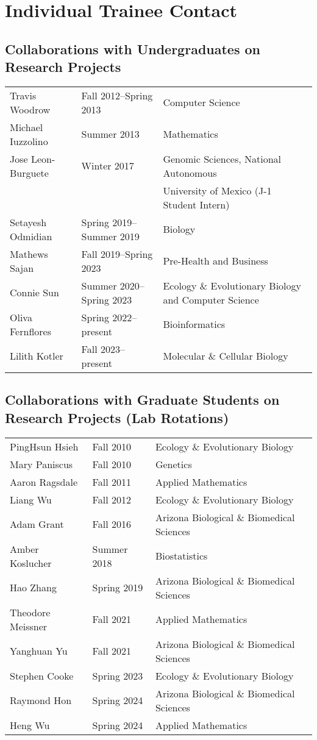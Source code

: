 \documentclass[11pt]{article}
\begin{document}
\section*{Individual Trainee Contact}

\subsection*{Collaborations with Undergraduates on Research Projects}
\begin{longtable}[l]{l l l}
Travis Woodrow & Fall 2012--Spring 2013 & Computer Science\\
Michael Iuzzolino & Summer 2013 & Mathematics\\
Jose Leon-Burguete & Winter 2017 & Genomic Sciences, National Autonomous\\ 
                   &             & University of Mexico (J-1 Student Intern)\\
Setayesh Odmidian & Spring 2019--Summer 2019 & Biology\\
Mathews Sajan & Fall 2019--Spring 2023 & Pre-Health and Business\\
Connie Sun & Summer 2020--Spring 2023 & Ecology \& Evolutionary Biology and Computer Science\\
Oliva Fernflores & Spring 2022--present & Bioinformatics\\
Lilith Kotler & Fall 2023--present & Molecular \& Cellular Biology\\
\end{longtable}

\subsection*{Collaborations with Graduate Students on Research Projects (Lab Rotations)}
\begin{longtable}[l]{l l l}
PingHsun Hsieh & Fall 2010 & Ecology \& Evolutionary Biology\\
Mary Paniscus & Fall 2010 & Genetics\\
Aaron Ragsdale & Fall 2011 & Applied Mathematics\\
Liang Wu & Fall 2012 & Ecology \& Evolutionary Biology\\
Adam Grant & Fall 2016 & Arizona Biological \& Biomedical Sciences\\
Amber Koslucher & Summer 2018 & Biostatistics\\
Hao Zhang & Spring 2019 & Arizona Biological \& Biomedical Sciences\\
Theodore Meissner & Fall 2021 & Applied Mathematics\\
Yanghuan Yu & Fall 2021 & Arizona Biological \& Biomedical Sciences\\
Stephen Cooke & Spring 2023 & Ecology \& Evolutionary Biology\\
Raymond Hon & Spring 2024 & Arizona Biological \& Biomedical Sciences\\
Heng Wu & Spring 2024 & Applied Mathematics\\
\end{longtable}
\end{document}

